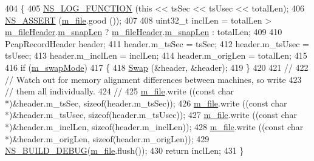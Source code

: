 \begin{DoxyCode}
404 \{
405   \hyperlink{log-macros-disabled_8h_a90b90d5bad1f39cb1b64923ea94c0761}{NS\_LOG\_FUNCTION} (\textcolor{keyword}{this} << tsSec << tsUsec << totalLen);
406   \hyperlink{assert_8h_a6dccdb0de9b252f60088ce281c49d052}{NS\_ASSERT} (\hyperlink{classns3_1_1PcapFile_ac8ecc2d37ff1e2a5148901e10f855c26}{m\_file}.good ());
407 
408   uint32\_t inclLen = totalLen > \hyperlink{classns3_1_1PcapFile_a44261d9566e738203968f357584e268c}{m\_fileHeader}.\hyperlink{structns3_1_1PcapFile_1_1PcapFileHeader_acadba930824bddafabd88a0b3f5e3289}{m\_snapLen} ? 
      \hyperlink{classns3_1_1PcapFile_a44261d9566e738203968f357584e268c}{m\_fileHeader}.\hyperlink{structns3_1_1PcapFile_1_1PcapFileHeader_acadba930824bddafabd88a0b3f5e3289}{m\_snapLen} : totalLen;
409 
410   PcapRecordHeader header;
411   header.m\_tsSec = tsSec;
412   header.m\_tsUsec = tsUsec;
413   header.m\_inclLen = inclLen;
414   header.m\_origLen = totalLen;
415 
416   \textcolor{keywordflow}{if} (\hyperlink{classns3_1_1PcapFile_a179acfdfb216038a20ddb8cdc5fe182d}{m\_swapMode})
417     \{
418       \hyperlink{classns3_1_1PcapFile_af5adf22a721473f1add1e002492f5587}{Swap} (&header, &header);
419     \}
420 
421   \textcolor{comment}{//}
422   \textcolor{comment}{// Watch out for memory alignment differences between machines, so write}
423   \textcolor{comment}{// them all individually.}
424   \textcolor{comment}{//}
425   \hyperlink{classns3_1_1PcapFile_ac8ecc2d37ff1e2a5148901e10f855c26}{m\_file}.write ((\textcolor{keyword}{const} \textcolor{keywordtype}{char} *)&header.m\_tsSec, \textcolor{keyword}{sizeof}(header.m\_tsSec));
426   \hyperlink{classns3_1_1PcapFile_ac8ecc2d37ff1e2a5148901e10f855c26}{m\_file}.write ((\textcolor{keyword}{const} \textcolor{keywordtype}{char} *)&header.m\_tsUsec, \textcolor{keyword}{sizeof}(header.m\_tsUsec));
427   \hyperlink{classns3_1_1PcapFile_ac8ecc2d37ff1e2a5148901e10f855c26}{m\_file}.write ((\textcolor{keyword}{const} \textcolor{keywordtype}{char} *)&header.m\_inclLen, \textcolor{keyword}{sizeof}(header.m\_inclLen));
428   \hyperlink{classns3_1_1PcapFile_ac8ecc2d37ff1e2a5148901e10f855c26}{m\_file}.write ((\textcolor{keyword}{const} \textcolor{keywordtype}{char} *)&header.m\_origLen, \textcolor{keyword}{sizeof}(header.m\_origLen));
429   \hyperlink{build-profile_8h_a8f46d39331904495b189a130c099c029}{NS\_BUILD\_DEBUG}(\hyperlink{classns3_1_1PcapFile_ac8ecc2d37ff1e2a5148901e10f855c26}{m\_file}.flush());
430   \textcolor{keywordflow}{return} inclLen;
431 \}
\end{DoxyCode}


